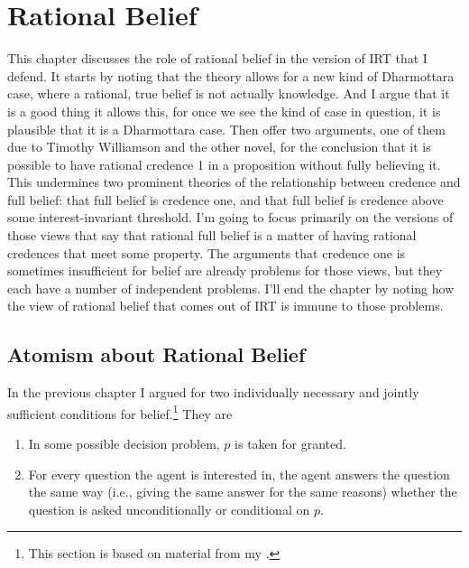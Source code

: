 \documentclass[11pt,]{book}
\providecommand{\tightlist}{%
  \setlength{\itemsep}{0pt}\setlength{\parskip}{0pt}}
\let\rmarkdownfootnote\footnote%
\def\footnote{\protect\rmarkdownfootnote}
\begin{document}
\hypertarget{ratbel}{%
\chapter{Rational Belief}\label{ratbel}}

This chapter discusses the role of rational belief in the version of IRT that I defend. It starts by noting that the theory allows for a new kind of Dharmottara case, where a rational, true belief is not actually knowledge. And I argue that it is a good thing it allows this, for once we see the kind of case in question, it is plausible that it is a Dharmottara case. Then offer two arguments, one of them due to Timothy Williamson and the other novel, for the conclusion that it is possible to have rational credence 1 in a proposition without fully believing it. This undermines two prominent theories of the relationship between credence and full belief: that full belief is credence one, and that full belief is credence above some interest-invariant threshold. I'm going to focus primarily on the versions of those views that say that rational full belief is a matter of having rational credences that meet some property. The arguments that credence one is sometimes insufficient for belief are already problems for those views, but they each have a number of independent problems. I'll end the chapter by noting how the view of rational belief that comes out of IRT is immune to those problems.

\hypertarget{atomism-about-rational-belief}{%
\section{Atomism about Rational Belief}\label{atomism-about-rational-belief}}

In the previous chapter I argued for two individually necessary and jointly sufficient conditions for belief.\footnote{This section is based on material from my \citeyearpar[sect. 3.1]{Weatherson2012}.} They are

\begin{enumerate}
\def\labelenumi{\arabic{enumi}.}
\tightlist
\item
  In some possible decision problem, \(p\) is taken for granted.
\item
  For every question the agent is interested in, the agent answers the question the same way (i.e., giving the same answer for the same reasons) whether the question is asked unconditionally or conditional on \(p\).
\end{enumerate}
\end{document}
